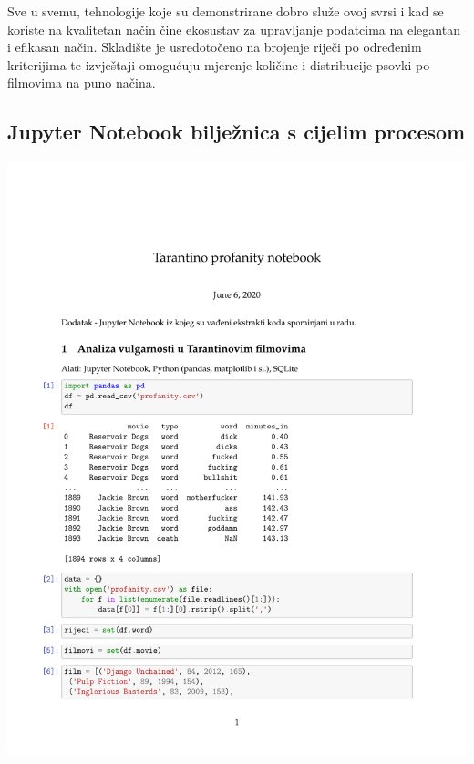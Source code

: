 \documentclass[11pt]{foi}
\begin{document}
Sve u svemu, tehnologije koje su demonstrirane dobro služe ovoj svrsi i kad se
koriste na kvalitetan način čine ekosustav za upravljanje podatcima na
elegantan i efikasan način. Skladište je usredotočeno na brojenje riječi po
određenim kriterijima te izvještaji omogućuju mjerenje količine i distribucije
psovki po filmovima na puno načina.

\begin{appendices}
\chapter{Jupyter Notebook bilježnica s cijelim procesom}
\centering
\includegraphics[page=1, scale=1.2]{notebook/nb.pdf}

\end{appendices}
\end{document}
